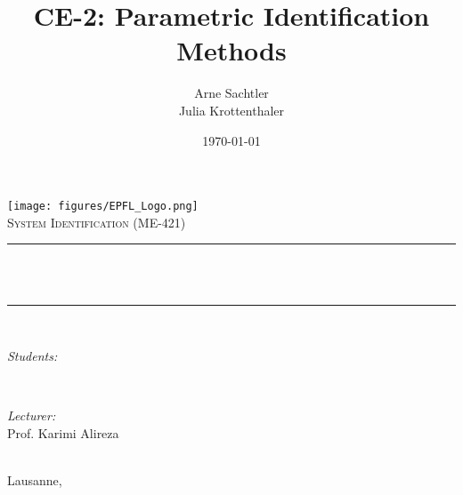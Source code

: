 
\begin{titlepage}
	\title{CE-2: Parametric Identification Methods} %
	\author{Arne Sachtler \\ Julia Krottenthaler}		%
	\date{\today}								%

	\makeatletter
	\let\thetitle\@title
	\let\theauthor\@author
	\let\thedate\@date
	\makeatother

	\centering
	\vspace*{0.5 cm}

    \texttt{[image: figures/EPFL\_Logo.png]}\\[1.0 cm]	
	\textsc{\Large System Identification (ME-421)}\\[1.0cm]				
	\rule{\linewidth}{0.2 mm} \\[0.5 cm]
	{ \LARGE \thetitle}\\
	\rule{\linewidth}{0.2 mm} \\[1.5 cm]
	
    \vspace{1cm}
	\begin{minipage}{0.5\textwidth}
		\begin{flushleft} \large
			\emph{{Students}:}\\
			\theauthor
			\end{flushleft}
			\end{minipage}~
			\begin{minipage}{0.4\textwidth}
			\begin{flushright} \large
			\emph{{Lecturer}:} \\	
			Prof. Karimi Alireza  \\
		\end{flushright}
	\end{minipage}\\[1.2cm]
	{\vspace{3cm} \large Lausanne, \thedate}\\[1.5 cm]
	\vfill
\end{titlepage}
